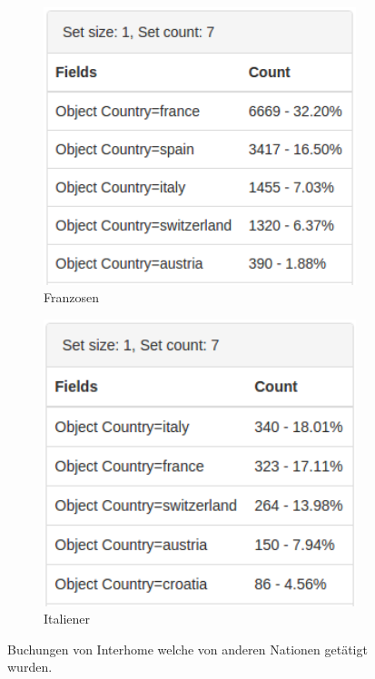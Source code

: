 \begin{figure}[H]
	\begin{subfigure}[t]{0.4\textwidth}
		\centering
		\includegraphics[width=1\textwidth]{images/hypothese3-2}
		\caption{Franzosen}
		\label{fig:testingfazit:testing:hypothesen:hypothese3:2:1}
	\end{subfigure} 
	\begin{subfigure}[t]{0.4\textwidth}
		\centering
		\includegraphics[width=1\textwidth]{images/hypothese3-3}
		\caption{Italiener}
		\label{fig:testingfazit:testing:hypothesen:hypothese3:2:2}
	\end{subfigure}
	\caption{Buchungen von Interhome welche von anderen Nationen getätigt wurden.}
	\label{fig:testingfazit:testing:hypothesen:hypothese3:2}
\end{figure}

